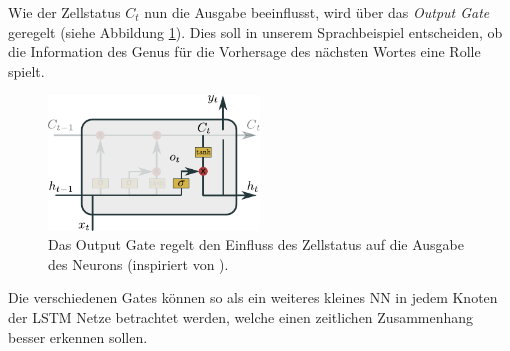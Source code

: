     Wie der Zellstatus $C_t$ nun die Ausgabe beeinflusst, wird über das \textit{Output Gate} geregelt (siehe Abbildung \ref{fig:LSTM_Output}).
    Dies soll in unserem Sprachbeispiel entscheiden, ob die Information des Genus für die Vorhersage des nächsten Wortes eine Rolle spielt. \cite{GERS2000} \cite{OLAH2015}
    	\begin{figure}[ht]
    		\centering
    		\includegraphics[width=0.5\textwidth]{images/Illustrationen/LSTM_OG}
    		\caption{Das Output Gate regelt den Einfluss des Zellstatus auf die Ausgabe des Neurons (inspiriert von \cite{OLAH2015}).}
    		\label{fig:LSTM_Output}
    	\end{figure}
    
    Die verschiedenen Gates können so als ein weiteres kleines NN in jedem Knoten der LSTM Netze betrachtet werden, welche einen zeitlichen Zusammenhang besser erkennen sollen.
    
